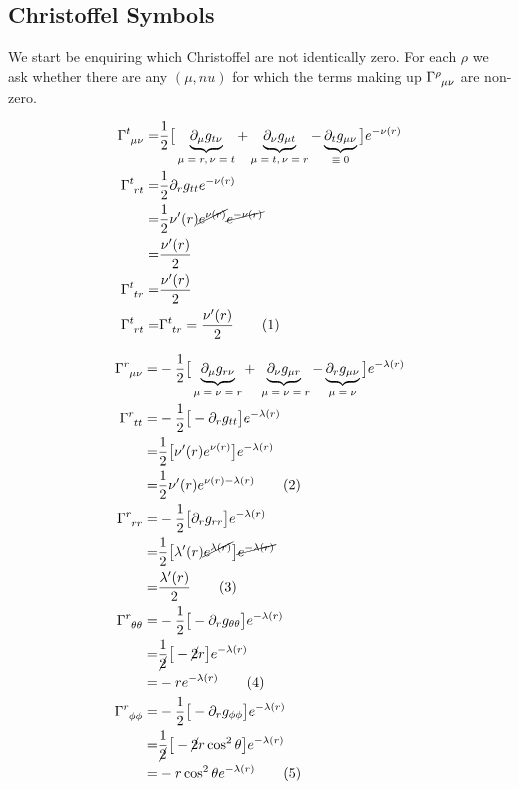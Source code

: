 \documentclass[]{article}
\newcommand\numberthis{\addtocounter{equation}{1}\tag{\theequation}}
\begin{document}
\subsection{Christoffel Symbols}

We start be enquiring which Christoffel are not identically zero. For each $\rho$ we ask whether there are any $(\mu,nu)$ for which the terms making up $\Gamma\indices{^\rho_{\mu\nu}}$ are non-zero.

\begin{align*}
	\Gamma\indices{^t_{\mu\nu}} =&\frac{1}{2} \big[\underbrace{ \partial_\mu g_{t\nu}}_\text{$\mu=r,\nu=t$} + \underbrace{\partial_\nu g_{\mu t}}_\text{$\mu=t,\nu=r$} - \underbrace{\partial_t g_{\mu\nu}}_\text{$\equiv0$}\big] e^{-\nu(r)}\\
	\Gamma\indices{^t_{rt}}=&\frac{1}{2} \partial_r g_{tt}  e^{-\nu(r)}\\
	=&\frac{1}{2}\nu^\prime(r) \cancel{e^{\nu(r)}}\cancel{e^{-\nu(r)}}\\
	=&\frac{\nu^\prime(r)}{2}\\
	\Gamma\indices{^t_{tr}}=&\frac{\nu^\prime(r)}{2}\\
	\Gamma\indices{^t_{rt}}=&\Gamma\indices{^t_{tr}}=\frac{\nu^\prime(r)}{2} \numberthis \label{eq:Gamma:ttr}
\end{align*}

\begin{align*}
	\Gamma\indices{^r_{\mu\nu}} =& - \frac{1}{2} \big[\underbrace{ \partial_\mu g_{r\nu}}_\text{$\mu=\nu=r$} + \underbrace{\partial_\nu g_{\mu r}}_\text{ $\mu=\nu=r$} - \underbrace{\partial_r g_{\mu\nu}}_\text{$\mu=\nu$}\big] e^{-\lambda(r)}\\
	\Gamma\indices{^r_{tt}} =&-\frac{1}{2} \big[-\partial_r g_{tt}\big]e^{-\lambda(r)}\\
	=&\frac{1}{2} \big[\nu^\prime(r) e^{\nu(r)}\big] e^{-\lambda(r)}\\
	=& \frac{1}{2} \nu^\prime(r) e^{\nu(r)-\lambda(r)} \numberthis \label{eq:Gamma:rtt}\\
	\Gamma\indices{^r_{rr}} =&-\frac{1}{2}\big[\partial_r g_{rr}\big] e^{-\lambda(r)}\\
	=&\frac{1}{2}\big[\lambda^\prime(r) \cancel{e^{\lambda(r)}}\big] \cancel{e^{-\lambda(r)}}\\
	=&\frac{\lambda^\prime(r)}{2} \numberthis \label{eq:Gamma:rrr}\\
	\Gamma\indices{^r_{\theta\theta}} =&-\frac{1}{2}\big[-\partial_r g_{\theta\theta}\big] e^{-\lambda(r)}\\
	=&\frac{1}{\cancel{2}}\big[-\cancel{2} r \big] e^{-\lambda(r)}\\
	=& -r  e^{-\lambda(r)}\numberthis \label{eq:Gamma:rtHtH}\\
	\Gamma\indices{^r_{\phi\phi}} =&-\frac{1}{2} \big[-\partial_r g_{\phi\phi}\big]e^{-\lambda(r)}\\
	=&\frac{1}{\cancel{2}} \big[-\cancel{2} r \cos^2 \theta\big]e^{-\lambda(r)}\\
	=& -r \cos^2 \theta e^{-\lambda(r)} \numberthis \label{eq:Gamma:rpHpH}
\end{align*}
\end{document}
